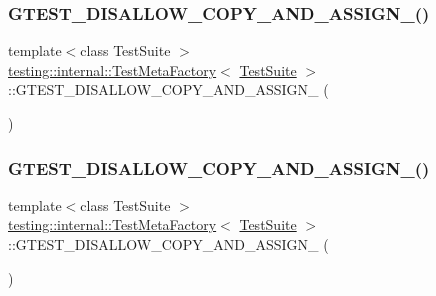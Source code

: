 \subsubsection{\texorpdfstring{GTEST\_DISALLOW\_COPY\_AND\_ASSIGN\_()}{GTEST\_DISALLOW\_COPY\_AND\_ASSIGN\_()}\hspace{0.1cm}{\footnotesize\ttfamily [2/3]}}
{\footnotesize\ttfamily template$<$class Test\+Suite $>$ \\
\mbox{\hyperlink{classtesting_1_1internal_1_1_test_meta_factory}{testing\+::internal\+::\+Test\+Meta\+Factory}}$<$ \mbox{\hyperlink{classtesting_1_1_test_suite}{Test\+Suite}} $>$\+::G\+T\+E\+S\+T\+\_\+\+D\+I\+S\+A\+L\+L\+O\+W\+\_\+\+C\+O\+P\+Y\+\_\+\+A\+N\+D\+\_\+\+A\+S\+S\+I\+G\+N\+\_\+ (\begin{DoxyParamCaption}\item[{\mbox{\hyperlink{classtesting_1_1internal_1_1_test_meta_factory}{Test\+Meta\+Factory}}$<$ \mbox{\hyperlink{classtesting_1_1_test_suite}{Test\+Suite}} $>$}]{ }\end{DoxyParamCaption})\hspace{0.3cm}{\ttfamily [private]}}

\mbox{\label{classtesting_1_1internal_1_1_test_meta_factory_a058168d58de97a9d8dfb7400ad878148}} 
\subsubsection{\texorpdfstring{GTEST\_DISALLOW\_COPY\_AND\_ASSIGN\_()}{GTEST\_DISALLOW\_COPY\_AND\_ASSIGN\_()}\hspace{0.1cm}{\footnotesize\ttfamily [3/3]}}
{\footnotesize\ttfamily template$<$class Test\+Suite $>$ \\
\mbox{\hyperlink{classtesting_1_1internal_1_1_test_meta_factory}{testing\+::internal\+::\+Test\+Meta\+Factory}}$<$ \mbox{\hyperlink{classtesting_1_1_test_suite}{Test\+Suite}} $>$\+::G\+T\+E\+S\+T\+\_\+\+D\+I\+S\+A\+L\+L\+O\+W\+\_\+\+C\+O\+P\+Y\+\_\+\+A\+N\+D\+\_\+\+A\+S\+S\+I\+G\+N\+\_\+ (\begin{DoxyParamCaption}\item[{\mbox{\hyperlink{classtesting_1_1internal_1_1_test_meta_factory}{Test\+Meta\+Factory}}$<$ \mbox{\hyperlink{classtesting_1_1_test_suite}{Test\+Suite}} $>$}]{ }\end{DoxyParamCaption})\hspace{0.3cm}{\ttfamily [private]}}



